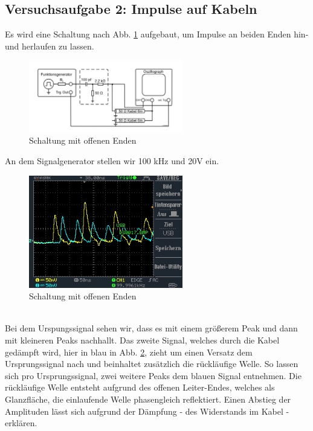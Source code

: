\documentclass[a4paper,10pt]{article}
\numberwithin{equation}{section}
\begin{document}
\subsection{Versuchsaufgabe 2: Impulse auf Kabeln}
Es wird eine Schaltung nach Abb. \ref{fig:2.1} aufgebaut, um Impulse an beiden Enden hin- und herlaufen zu lassen.
\begin{figure}[h]
        \centering
        \includegraphics[width=0.6\textwidth]{Schaltung_offen.png}
        \caption{Schaltung mit offenen Enden}
		\label{fig:2.1}
\end{figure}
An dem Signalgenerator stellen wir 100 kHz und 20V ein.
\begin{figure}[h]
        \centering
        \includegraphics[width=0.6\textwidth]{data/DS0017.BMP.png}
        \caption{Schaltung mit offenen Enden}
		\label{fig:2.2}
\end{figure}\\
Bei dem Urspungssignal sehen wir, dass es mit einem größerem Peak und dann mit kleineren Peaks nachhallt. Das zweite Signal, welches durch die Kabel gedämpft wird, hier in blau in Abb. \ref{fig:2.2}, zieht um einen Versatz dem Ursprungssignal nach und beinhaltet zusätzlich die rückläufige Welle. So lassen sich pro Ursprungssignal, zwei weitere Peaks dem blauen Signal entnehmen. Die rückläufige Welle entsteht aufgrund des offenen Leiter-Endes, welches als Glanzfläche, die einlaufende Welle phasengleich reflektiert. Einen Abstieg der Amplituden lässt sich aufgrund der Dämpfung - des Widerstands im Kabel - erklären.
\end{document}
